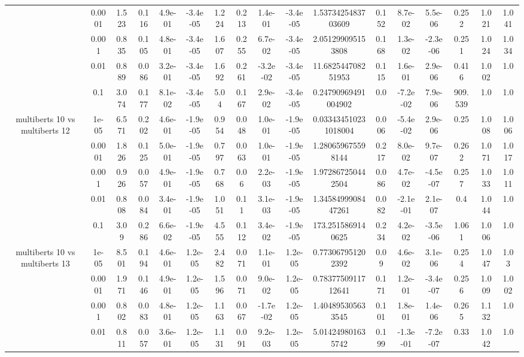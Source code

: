 \begin{tabular}{|c|c|c|c|c|c|c|c|c|c|c|c|c|c|c|c|c|}
 & 0.0001 & 1.523 & 0.116 & 4.9e-01 & -3.4e-05 & 1.224 & 0.213 & 1.4e-01 & -3.4e-05 & 1.5373425483703609 & 0.152 & 8.7e-02 & 5.5e-06 & 0.252 & 1.021 & 1.041 \\
 & 0.001 & 0.835 & 0.105 & 4.8e-01 & -3.4e-05 & 1.607 & 0.255 & 6.7e-02 & -3.4e-05 & 2.051299095153808 & 0.168 & 1.3e-02 & -2.3e-06 & 0.251 & 1.024 & 1.034 \\
 & 0.01 & 0.889 & 0.086 & 3.2e-01 & -3.4e-05 & 1.692 & 0.261 & -3.2e-02 & -3.4e-05 & 11.682544708251953 & 0.115 & 1.6e-01 & 2.9e-06 & 0.416 & 1.002 & 1.0 \\
 & 0.1 & 3.074 & 0.177 & 8.1e-02 & -3.4e-05 & 5.04 & 0.167 & 2.9e-02 & -3.4e-05 & 0.24790969491004902 & 0.0 & -7.2e-02 & 7.9e-06 & 909.539 & 1.0 & 1.0 \\
\hline
\multirow{5}{*}{multiberts 10 vs multiberts 12} & 1e-05 & 6.571 & 0.202 & 4.6e-01 & -1.9e-05 & 0.954 & 0.048 & 1.0e-01 & -1.9e-05 & 0.033434510231018004 & 0.006 & -5.4e-02 & 2.9e-06 & 0.25 & 1.008 & 1.006 \\
 & 0.0001 & 1.826 & 0.125 & 5.0e-01 & -1.9e-05 & 0.797 & 0.063 & 1.0e-01 & -1.9e-05 & 1.280659675598144 & 0.217 & 8.0e-02 & 9.7e-07 & 0.262 & 1.071 & 1.017 \\
 & 0.001 & 0.926 & 0.057 & 4.9e-01 & -1.9e-05 & 0.768 & 0.06 & 2.2e-03 & -1.9e-05 & 1.972867250442504 & 0.086 & 4.7e-02 & -4.5e-07 & 0.257 & 1.033 & 1.011 \\
 & 0.01 & 0.808 & 0.084 & 3.4e-01 & -1.9e-05 & 1.051 & 0.11 & 3.1e-03 & -1.9e-05 & 1.3458499908447261 & 0.082 & -2.1e-01 & 2.1e-07 & 0.4 & 1.044 & 1.0 \\
 & 0.1 & 3.09 & 0.286 & 6.6e-02 & -1.9e-05 & 4.555 & 0.112 & 3.4e-02 & -1.9e-05 & 173.2515869140625 & 0.234 & 4.2e-02 & -3.5e-06 & 1.061 & 1.006 & 1.0 \\
\hline
\multirow{5}{*}{multiberts 10 vs multiberts 13} & 1e-05 & 8.501 & 0.194 & 4.6e-01 & 1.2e-05 & 2.482 & 0.071 & 1.1e-01 & 1.2e-05 & 0.773067951202392 & 0.09 & 4.6e-02 & 3.1e-06 & 0.254 & 1.047 & 1.03 \\
 & 0.0001 & 1.971 & 0.146 & 4.9e-01 & 1.2e-05 & 1.596 & 0.071 & 9.0e-02 & 1.2e-05 & 0.7837750911712641 & 0.171 & 1.2e-01 & -3.4e-07 & 0.256 & 1.009 & 1.002 \\
 & 0.001 & 0.802 & 0.083 & 4.8e-01 & 1.2e-05 & 1.163 & 0.067 & -1.7e-02 & 1.2e-05 & 1.404895305633545 & 0.101 & 1.8e-01 & 1.4e-06 & 0.265 & 1.132 & 1.0 \\
 & 0.01 & 0.811 & 0.057 & 3.6e-01 & 1.2e-05 & 1.131 & 0.091 & 9.2e-03 & 1.2e-05 & 5.014249801635742 & 0.199 & -1.3e-01 & -7.2e-07 & 0.33 & 1.042 & 1.0 \\

\end{tabular}
